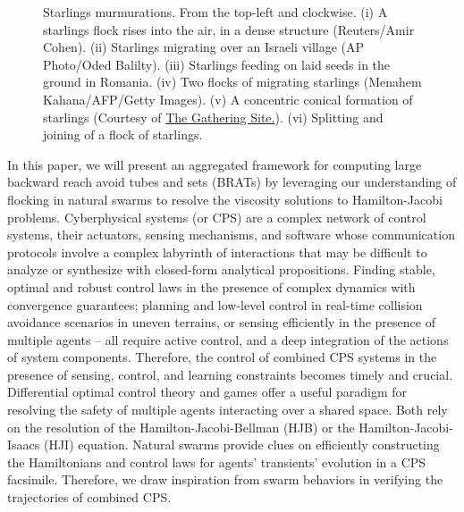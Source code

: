 \begin{figure}[tb!]
\begin{tabular}{ccc}
	\end{tabular}
	\caption{Starlings murmurations. From the top-left and clockwise. (i) A starlings flock rises into the air, in a dense structure (Reuters/Amir Cohen).  (ii) Starlings migrating over an Israeli village (AP Photo/Oded Balilty). (iii) Starlings feeding on laid seeds  in the ground in Romania. (iv) Two flocks of migrating starlings (Menahem Kahana/AFP/Getty Images). (v) A concentric conical formation of starlings (Courtesy of \href{http://www.thegatheringsite.net/qcgems/2014/1/24/murmuration}{The Gathering Site.}). (vi)  Splitting and joining of a flock of starlings.} 
	\label{fig:murmurations}
\end{figure}

\noindent
In this paper, we will present an aggregated framework for computing large backward reach avoid tubes and sets (BRATs) by  leveraging our understanding of flocking in natural swarms to resolve the viscosity solutions to Hamilton-Jacobi problems. Cyberphysical systems (or CPS) are  a complex network of control systems, their actuators, sensing mechanisms, and software whose communication protocols involve a complex labyrinth of interactions that may be difficult to analyze or synthesize with closed-form analytical propositions.   Finding stable, optimal and robust control laws in the presence of complex dynamics with convergence guarantees; planning and low-level control in real-time collision avoidance scenarios in uneven terrains, or sensing efficiently in the presence of multiple agents -- all require active control, and a deep integration of the actions of system components. Therefore,  the control of combined CPS systems in the presence of sensing, control, and learning constraints becomes timely and crucial. Differential optimal control theory and games offer a useful paradigm for resolving the safety of multiple agents interacting over a shared space. Both rely on the resolution of the Hamilton-Jacobi-Bellman (HJB) or the Hamilton-Jacobi-Isaacs (HJI) equation.  Natural swarms provide clues on efficiently constructing the Hamiltonians and control laws for agents' transients' evolution in a CPS facsimile. Therefore, we draw inspiration from swarm behaviors in verifying the trajectories of combined CPS.

